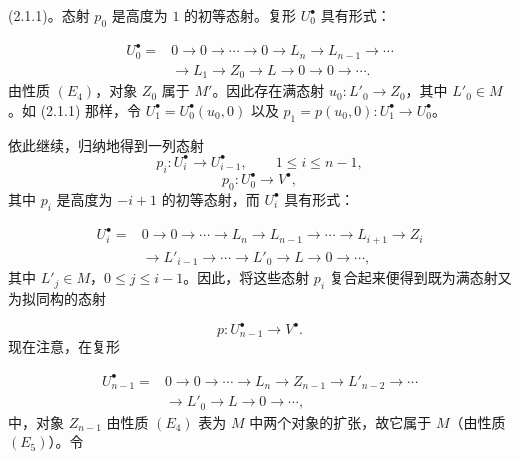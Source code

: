 \clearpage
{}%
\begingroup\small\setlength{\parskip}{0pt}\setlength{\emergencystretch}{1.5em}
\setlength{\abovedisplayskip}{4pt plus 2pt minus 2pt}%
\setlength{\belowdisplayskip}{4pt plus 2pt minus 2pt}%

(2.1.1)。态射 $p_0$ 是高度为 $1$ 的初等态射。复形 $U_0^\bullet$ 具有形式：

\[
\begin{aligned}
U_0^\bullet={}&0\longrightarrow0\longrightarrow\cdots\longrightarrow0
\longrightarrow L_n\longrightarrow L_{n-1}\longrightarrow\cdots\\
&\longrightarrow L_1\longrightarrow Z_0\longrightarrow L
\longrightarrow0\longrightarrow0\longrightarrow\cdots.
\end{aligned}
\]
由性质 $(E_4)$，对象 $Z_0$ 属于 $M'$。因此存在满态射
$u_0\colon L'_0\longrightarrow Z_0$，其中 $L'_0\in M$。如 (2.1.1) 那样，令
$U_1^\bullet=U_0^\bullet(u_0,0)$ 以及
$p_1=p(u_0,0)\colon U_1^\bullet\longrightarrow U_0^\bullet$。

依此继续，归纳地得到一列态射
\[
p_i\colon U_i^\bullet\longrightarrow U_{i-1}^\bullet,
\qquad 1\leq i\leq n-1,
\]
\[
p_0\colon U_0^\bullet\longrightarrow V^\bullet,
\]
其中 $p_i$ 是高度为 $-i+1$ 的初等态射，而 $U_i^\bullet$ 具有形式：

\[
\begin{aligned}
U_i^\bullet={}&0\longrightarrow0\longrightarrow\cdots
\longrightarrow L_n\longrightarrow L_{n-1}\longrightarrow\cdots
\longrightarrow L_{i+1}\longrightarrow Z_i\\
&\longrightarrow L'_{i-1}\longrightarrow\cdots\longrightarrow L'_0
\longrightarrow L\longrightarrow0\longrightarrow\cdots ,
\end{aligned}
\]
其中 $L'_j\in M$，$0\leq j\leq i-1$。因此，将这些态射 $p_i$ 复合起来便得到既为满态射又为拟同构的态射

\[
p\colon U_{n-1}^\bullet\longrightarrow V^\bullet.
\]
现在注意，在复形

\[
\begin{aligned}
U_{n-1}^\bullet={}&0\longrightarrow0\longrightarrow\cdots
\longrightarrow L_n\longrightarrow Z_{n-1}\longrightarrow L'_{n-2}
\longrightarrow\cdots\\
&\longrightarrow L'_0\longrightarrow L\longrightarrow0
\longrightarrow\cdots ,
\end{aligned}
\]
中，对象 $Z_{n-1}$ 由性质 $(E_4)$ 表为 $M$ 中两个对象的扩张，故它属于
$M$（由性质 $(E_5)$）。令

